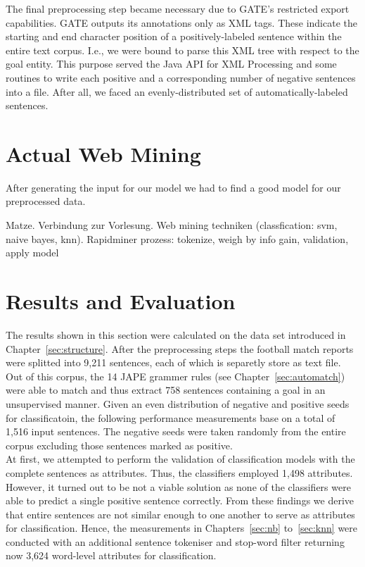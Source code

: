 \documentclass[11pt,titlepage,oneside,openany]{book}
\begin{document}
The final preprocessing step became necessary due to GATE's restricted export capabilities. GATE outputs its annotations only as XML tags. These indicate the starting and end character position of a  positively-labeled sentence within the entire text corpus. I.e., we were bound to parse this XML tree with respect to the goal entity. This purpose served the Java API for XML Processing and some routines to write each positive and a corresponding number of negative sentences into a file. After all, we faced an evenly-distributed set of automatically-labeled sentences.

\section{Actual Web Mining}
\label{sec:webmining}
After generating the input for our model we had to find a good model for our preprocessed data. 

Matze. Verbindung zur Vorlesung. Web mining techniken (classfication: svm, naive bayes, knn). Rapidminer prozess: tokenize, weigh by info gain, validation, apply model

\section{Results and Evaluation}
\label{sec:eval}

The results shown in this section were calculated on the data set introduced in Chapter~\ref{sec:structure}. After the preprocessing steps the football match reports were splitted into 9,211 sentences, each of which is separetly store as text file. Out of this corpus, the 14 JAPE grammer rules (see Chapter~\ref{sec:automatch}) were able to match and thus extract 758 sentences containing a goal in an unsupervised manner. Given an even distribution of negative and positive seeds for classificatoin, the following performance measurements base on a total of 1,516 input sentences. The negative seeds were taken randomly from the entire corpus excluding those sentences marked as positive.\\
At first, we attempted to perform the validation of classification models with the complete sentences as attributes. Thus, the classifiers employed 1,498 attributes. However, it turned out to be not a viable solution as none of the classifiers were able to predict a single positive sentence correctly. From these findings we derive that entire sentences are not similar enough to one another to serve as attributes for classification. Hence, the measurements in Chapters~\ref{sec:nb} to~\ref{sec:knn} were conducted with an additional sentence tokeniser and stop-word filter returning now 3,624 word-level attributes for classification.
\end{document}
